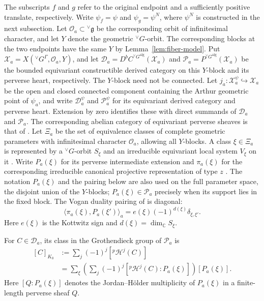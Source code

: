 \documentclass[10pt]{amsart}
\numberwithin{equation}{section}
\theoremstyle{plain}
\theoremstyle{definition}
\theoremstyle{remark}
\newcommand{\CC}{\mathbb C}
\newcommand{\fg}{\mathfrak g}
\newcommand{\vG}{{}^{\vee}G}
\newcommand{\vfg}{{}^{\vee}\fg}
\newcommand{\OO}{\mathcal O}
\newcommand{\alg}{\mathrm{alg}}
\begin{document}
The subscripts $f$ and $g$ refer to the original endpoint and a sufficiently
positive translate, respectively. Write $\psi_f=\psi$ and
$\psi_g=\psi^N$, where $\psi^N$ is constructed in the next subsection.
Let $\OO_a\subset\vfg$ be the corresponding orbit of infinitesimal character,
and let $Y$ denote the geometric $\vG$-orbit. The corresponding blocks at the two
endpoints have the same $Y$ by Lemma~\ref{lem:fiber-model}.
Put $\mathcal X_a=X(\vG^\Gamma,\OO_a,Y)$, and let
$\mathcal D_a=D^bC^{\vG^{\alg}}(\mathcal X_a)$ and
$\mathcal P_a=P^{\vG^{\alg}}(\mathcal X_a)$
be the bounded equivariant constructible derived
category on this $Y$-block and its perverse heart, respectively.
The $Y$-block need not be connected. Let
$j_a:\mathcal X_a^\psi\hookrightarrow\mathcal X_a$ be the open and
closed connected component containing the Arthur geometric point of
$\psi_a$, and write $\mathcal D_a^\psi$ and $\mathcal P_a^\psi$ for
its equivariant derived category and perverse heart. Extension by zero
identifies these with direct summands of $\mathcal D_a$ and
$\mathcal P_a$. The
corresponding abelian category of equivariant perverse sheaves is that of
\cite[Definition~7.7]{ABV92}. Let $\Xi_a$ be the set of equivalence classes
of complete geometric parameters with infinitesimal character $\OO_a$,
allowing all $Y$-blocks. A class $\xi\in\Xi_a$ is represented by a $\vG$-orbit
$S_\xi$ and an irreducible equivariant local system $V_\xi$ on it
\cite[Definition~7.6]{ABV92}. Write $P_a(\xi)$ for its perverse
intermediate extension and $\pi_a(\xi)$ for the corresponding irreducible
canonical projective representation of type $z$
\cite[(7.10)(d), Theorem~10.4, and Definition~10.8]{ABV92}.
The notation $P_a(\xi)$ and the pairing below are also used on the full
parameter space, the disjoint union of the $Y$-blocks;
$P_a(\xi)\in\mathcal P_a$ precisely when its support lies in the fixed
block. The Vogan duality
pairing of \cite[Theorem~15.12]{ABV92} is diagonal:
\begin{equation}\label{eq:vogan}
 \langle\pi_a(\xi),P_a(\xi')\rangle_a
 =
 e(\xi)(-1)^{d(\xi)}\delta_{\xi,\xi'}.
\end{equation}
Here $e(\xi)$ is the Kottwitz sign and $d(\xi)=\dim_{\CC}S_\xi$.

For $C\in\mathcal D_a$, its class in the Grothendieck group of
$\mathcal P_a$ is
\[
 \begin{aligned}
 [C]_{K_0}
   &:=\sum_j(-1)^j[{}^p\mathcal H^j(C)] \\
   &=\sum_\xi\left(\sum_j(-1)^j
      [{}^p\mathcal H^j(C):P_a(\xi)]\right)[P_a(\xi)].
 \end{aligned}
\]
Here $[Q:P_a(\xi)]$ denotes the Jordan--H\"older multiplicity of
$P_a(\xi)$ in a finite-length perverse sheaf $Q$.
\end{document}
